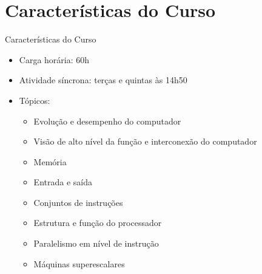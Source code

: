    \section[ slide = true]{Características do Curso}
      \begin{slide}[toc=]{Características do Curso}
         \begin{itemize}
            \item Carga horária: 60h
            \item Atividade síncrona: terças e quintas às 14h50 
            \item Tópicos:
            \begin{itemize}
               \item Evolução e desempenho do computador
               \item Visão de alto nível da função e interconexão do computador
               \item Memória
               \item Entrada e saída
               \item Conjuntos de instruções
               \item Estrutura e função do processador
               \item Paralelismo em nível de instrução
               \item Máquinas superescalares
            \end{itemize}
         \end{itemize}         
      \end{slide}
      

